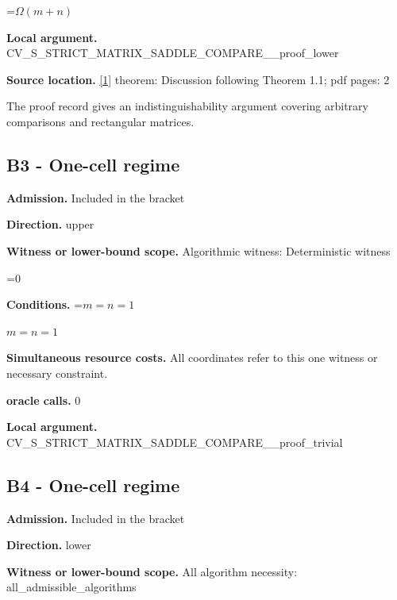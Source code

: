 \documentclass[10pt,a4paper]{article}
\newcommand{\AtlasMath}[1]{\par\begingroup\centering\setbox0=\hbox{$\displaystyle #1$}\ifdim\wd0>1.4\linewidth\typeout{ATLAS WIDE FORMULA: \the\wd0}\fi\ifdim\wd0>\linewidth\resizebox{\linewidth}{!}{\box0}\else\box0\fi\par\endgroup}
\newcommand{\AtlasInlineMath}[1]{\begingroup\setbox0=\hbox{$#1$}\ifdim\wd0>.4\linewidth\endgroup\AtlasMath{#1}\else\endgroup$#1$\fi}
\begin{document}
\AtlasMath{\Omega(m+n)}


\textbf{Local argument.} CV\_S\_STRICT\_MATRIX\_SADDL\allowbreak{}E\_COMPARE\_\_proof\_lower



\textbf{Source location.} \href{https://arxiv.org/abs/2607.22312v1}{[1]} theorem: Discussion following Theorem 1.1; pdf pages: 2



The proof record gives an indistinguishability argument covering arbitrary comparisons and rectangular matrices.



\subsection{B3 - One-cell regime}


\textbf{Admission.} Included in the bracket



\textbf{Direction.} upper



\textbf{Witness or lower-bound scope.} Algorithmic witness: Deterministic witness



\AtlasMath{0}


\textbf{Conditions.} \AtlasInlineMath{m=n=1}



\textbf{Simultaneous resource costs.} All coordinates refer to this one witness or necessary constraint.



\textbf{oracle calls.} 0



\textbf{Local argument.} CV\_S\_STRICT\_MATRIX\_SADDL\allowbreak{}E\_COMPARE\_\_proof\_trivial



\subsection{B4 - One-cell regime}


\textbf{Admission.} Included in the bracket



\textbf{Direction.} lower



\textbf{Witness or lower-bound scope.} All algorithm necessity: all\_admissible\_algorithms
\end{document}

